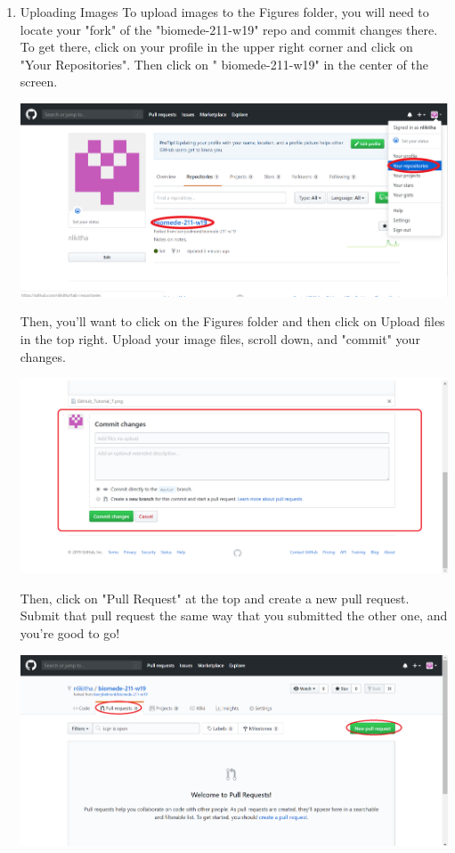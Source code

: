 \documentclass[11pt]{book}
\begin{document}
\begin{enumerate}
\item Uploading Images
\subitem To upload images to the Figures folder, you will need to locate your "fork" of the "biomede-211-w19" repo and commit changes there. To get there, click on your profile in the upper right corner and click on "Your Repositories". Then click on " biomede-211-w19" in the center of the screen. 

\includegraphics[width=\textwidth]{figures/GitHub_Tutorial_6.png}

\subitem Then, you'll want to click on the Figures folder and then click on Upload files in the top right. Upload your image files, scroll down, and "commit" your changes. 

\includegraphics[width=\textwidth]{figures/GitHub_Tutorial_7.png}

\subitem Then, click on "Pull Request" at the top and create a new pull request. Submit that pull request the same way that you submitted the other one, and you're good to go!

\includegraphics[width=\textwidth]{figures/GitHub_Tutorial_8.png}

\end{enumerate}
\end{document}
